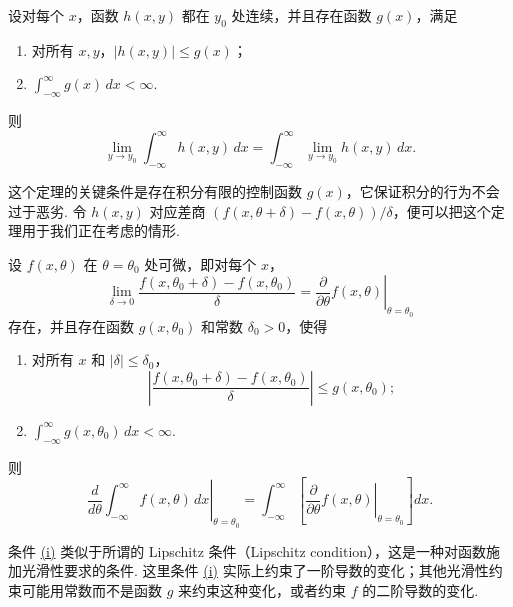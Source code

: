 \begin{theorem}\label{thm:2.4.2}
设对每个 $x$，函数 $h(x,y)$ 都在 $y_0$ 处连续，并且存在函数 $g(x)$，满足
\begin{enumerate}
\item[(i)] 对所有 $x,y$，$|h(x,y)|\le g(x)$；
\item[(ii)] $\int_{-\infty}^\infty g(x)\,dx<\infty$.
\end{enumerate}
则
$$\lim_{y\to y_0}\int_{-\infty}^\infty h(x,y)\,dx
=\int_{-\infty}^\infty\lim_{y\to y_0}h(x,y)\,dx.$$
\end{theorem}
这个定理的关键条件是存在积分有限的控制函数 $g(x)$，它保证积分的行为不会过于恶劣. 令 $h(x,y)$ 对应差商 $(f(x,\theta+\delta)-f(x,\theta))/\delta$，便可以把这个定理用于我们正在考虑的情形.

\begin{theorem}\label{thm:2.4.3}
设 $f(x,\theta)$ 在 $\theta=\theta_0$ 处可微，即对每个 $x$，
$$\lim_{\delta\to0}\frac{f(x,\theta_0+\delta)-f(x,\theta_0)}\delta
=\left.\frac\partial{\partial\theta}f(x,\theta)\right|_{\theta=\theta_0}$$
存在，并且存在函数 $g(x,\theta_0)$ 和常数 $\delta_0>0$，使得
\begin{enumerate}
\item[(i)]\label{itm:thm:2.4.3:i} 对所有 $x$ 和 $|\delta|\le\delta_0$，
$$\left|\frac{f(x,\theta_0+\delta)-f(x,\theta_0)}\delta\right|\le g(x,\theta_0);$$
\item[(ii)]\label{itm:thm:2.4.3:ii} $\int_{-\infty}^\infty g(x,\theta_0)\,dx<\infty$.
\end{enumerate}
则
\begin{equation}\label{eq:2.4.2}
\left.\frac d{d\theta}\int_{-\infty}^\infty f(x,\theta)\,dx\right|_{\theta=\theta_0}
=\int_{-\infty}^\infty\left[\left.\frac\partial{\partial\theta}f(x,\theta)\right|_{\theta=\theta_0}\right]dx.
\end{equation}
\end{theorem}
条件 \hyperref[itm:thm:2.4.3:i]{(i)} 类似于所谓的 Lipschitz 条件（Lipschitz condition），这是一种对函数施加光滑性要求的条件. 这里条件 \hyperref[itm:thm:2.4.3:i]{(i)} 实际上约束了一阶导数的变化；其他光滑性约束可能用常数而不是函数 $g$ 来约束这种变化，或者约束 $f$ 的二阶导数的变化.

